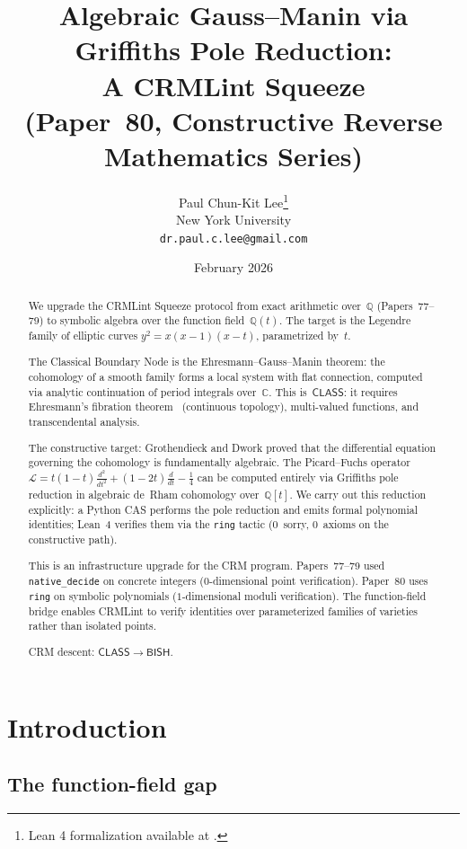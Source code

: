 \documentclass[11pt]{article}
\title{Algebraic Gauss--Manin via Griffiths Pole Reduction:\\
  A CRMLint Squeeze\\[6pt]
  {\large (Paper~80, Constructive Reverse Mathematics Series)}}
\author{Paul Chun-Kit Lee\thanks{Lean 4 formalization available at \leanRepo.} \\
New York University \\
\texttt{dr.paul.c.lee@gmail.com}}
\date{February 2026}
\theoremstyle{plain}
\theoremstyle{definition}
\theoremstyle{remark}
\newcommand{\Q}{\mathbb{Q}}
\newcommand{\C}{\mathbb{C}}
\newcommand{\calL}{\mathcal{L}}
\newcommand{\BISH}{\mathsf{BISH}}
\newcommand{\CLASS}{\mathsf{CLASS}}
\begin{document}
\maketitle

\begin{abstract}
We upgrade the CRMLint Squeeze protocol from exact arithmetic
over~$\Q$ (Papers~77--79) to symbolic algebra over the function
field~$\Q(t)$.  The target is the Legendre family of elliptic
curves $y^2 = x(x-1)(x-t)$, parametrized by~$t$.

The Classical Boundary Node is the Ehresmann--Gauss--Manin theorem:
the cohomology of a smooth family forms a local system with flat
connection, computed via analytic continuation of period integrals
over~$\C$.  This is~$\CLASS$: it requires Ehresmann's fibration
theorem~\cite{Ehresmann1950} (continuous topology), multi-valued functions, and
transcendental analysis.

The constructive target: Grothendieck and Dwork proved that the
differential equation governing the cohomology is fundamentally
algebraic.  The Picard--Fuchs operator
$\calL = t(1-t)\frac{d^2}{dt^2} + (1-2t)\frac{d}{dt} - \frac{1}{4}$
can be computed entirely via Griffiths pole reduction in
algebraic de~Rham cohomology over~$\Q[t]$.  We carry out this
reduction explicitly: a Python CAS performs the pole reduction
and emits formal polynomial identities; Lean~4 verifies them via
the \texttt{ring} tactic (0~sorry, 0~axioms on the constructive
path).

This is an infrastructure upgrade for the CRM program.
Papers~77--79 used \texttt{native\_decide} on concrete integers
($0$-dimensional point verification).  Paper~80 uses \texttt{ring}
on symbolic polynomials ($1$-dimensional moduli verification).
The function-field bridge enables CRMLint to verify identities
over parameterized families of varieties rather than isolated points.

CRM descent: $\CLASS \to \BISH$.
\end{abstract}

\tableofcontents

\section{Introduction}\label{sec:intro}

\subsection{The function-field gap}
\end{document}
